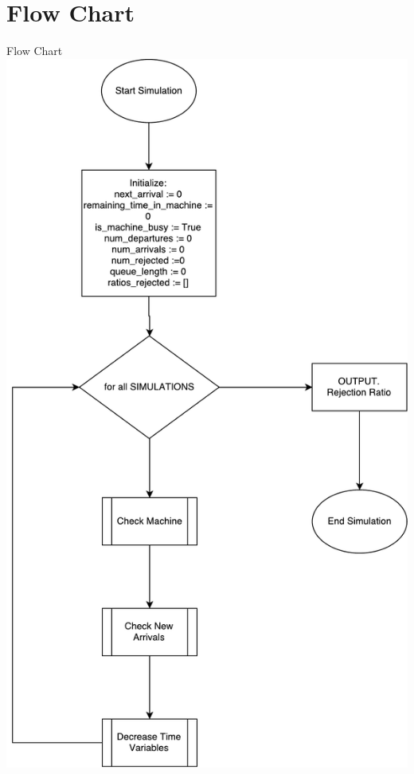 \section{Flow Chart}
\begin{frame}{Flow Chart}
	\centering
  	\includegraphics[scale=0.22]{BSP24_FlowChart.pdf}
\end{frame}

